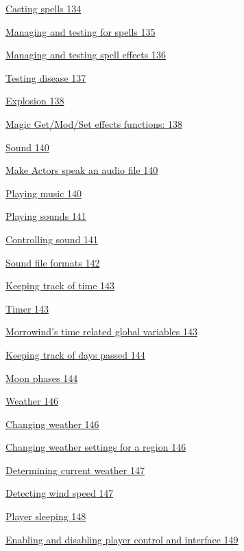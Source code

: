 \documentclass[
]{article}
\begin{document}
\protect\hyperlink{casting-spells}{Casting spells 134}

\protect\hyperlink{managing-and-testing-for-spells}{Managing and testing
for spells 135}

\protect\hyperlink{managing-and-testing-spell-effects}{Managing and
testing spell effects 136}

\protect\hyperlink{testing-disease}{Testing disease 137}

\protect\hyperlink{explosion}{Explosion 138}

\protect\hyperlink{magic-getmodset-effects-functions}{Magic Get/Mod/Set
effects functions: 138}

\protect\hyperlink{sound}{Sound 140}

\protect\hyperlink{make-actors-speak-an-audio-file}{Make Actors speak an
audio file 140}

\protect\hyperlink{playing-music}{Playing music 140}

\protect\hyperlink{playing-sounds}{Playing sounds 141}

\protect\hyperlink{controlling-sound}{Controlling sound 141}

\protect\hyperlink{sound-file-formats}{Sound file formats 142}

\protect\hyperlink{keeping-track-of-time}{Keeping track of time 143}

\protect\hyperlink{timer}{Timer 143}

\protect\hyperlink{morrowinds-time-related-global-variables}{Morrowind's
time related global variables 143}

\protect\hyperlink{keeping-track-of-days-passed}{Keeping track of days
passed 144}

\protect\hyperlink{moon-phases}{Moon phases 144}

\protect\hyperlink{weather}{Weather 146}

\protect\hyperlink{changing-weather}{Changing weather 146}

\protect\hyperlink{changing-weather-settings-for-a-region}{Changing
weather settings for a region 146}

\protect\hyperlink{determining-current-weather}{Determining current
weather 147}

\protect\hyperlink{detecting-wind-speed}{Detecting wind speed 147}

\protect\hyperlink{player-sleeping}{Player sleeping 148}

\protect\hyperlink{enabling-and-disabling-player-control-and-interface}{Enabling
and disabling player control and interface 149}
\end{document}
